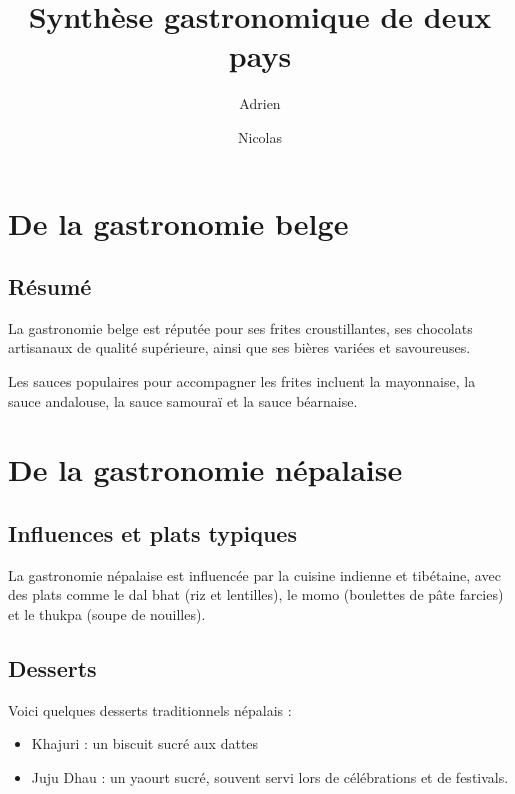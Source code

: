 \documentclass[a4paper,12pt]{scrartcl}
\title{Synthèse gastronomique de deux pays}
\author{Adrien \and Nicolas}
\begin{document}
\maketitle

\section{De la gastronomie belge}
	\subsection{Résumé}
	La gastronomie belge est réputée pour ses frites croustillantes, ses chocolats artisanaux de qualité supérieure,
	ainsi que ses bières variées et savoureuses.


	Les sauces populaires pour accompagner les frites incluent la mayonnaise, la sauce andalouse, la sauce samouraï et
	la sauce béarnaise.


\section{De la gastronomie népalaise}
	\subsection{Influences et plats typiques}
	La gastronomie népalaise est influencée par la cuisine indienne et tibétaine, avec des plats comme le dal bhat 
	(riz et lentilles), le momo (boulettes de pâte farcies) et le thukpa (soupe de nouilles).

	\subsection{Desserts}
	Voici quelques desserts traditionnels népalais :

		\begin{itemize}
			\item Khajuri : un biscuit sucré aux dattes
			\item Juju Dhau : un yaourt sucré, souvent servi lors de célébrations et de festivals.
		\end{itemize}
\end{document}
